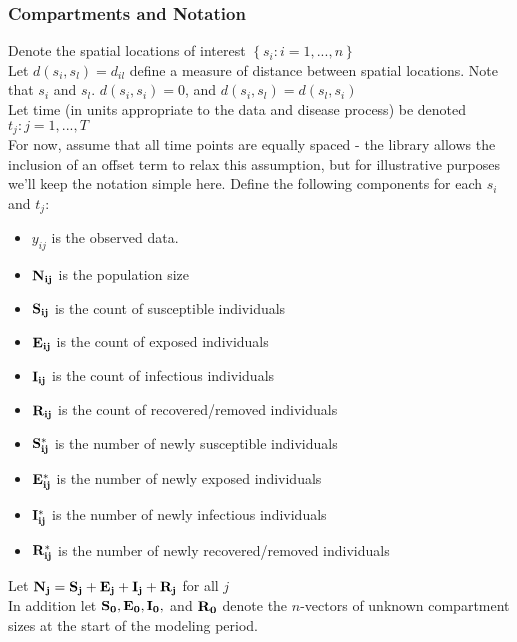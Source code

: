 \documentclass[12pt]{article}
\newcommand \itx {\indent \indent \indent}
\newcommand \mbreak {\\ \vspace{0.1in}}
\begin{document}
    \subsubsection{Compartments and Notation}
    {
        \itx
        Denote the spatial locations of interest $\left\{s_i : i = 1, ...,n \right\}$ \\
        Let $d(s_i, s_l) = d_{il}$ define a measure of distance between 
        spatial locations. Note that $s_i$ and $s_l$. $d(s_i, s_i) = 0$, and $d(s_i, s_l) = d(s_l, s_i)$ \\
        
        
        Let time (in units appropriate to the data and disease process) be denoted ${t_j : j = 1, ...,T}$ \\
        For now, assume that all time points are equally spaced - the library allows the inclusion of an offset term 
        to relax this assumption, but for illustrative purposes we'll keep the notation simple here. 
        Define the following components for each $s_i$ and $t_j$: \mbreak
    }
        \begin{itemize}
            \item {$y_{ij}$} is the observed data.
            \item {$\bf{N_{ij}}$} is the population size
            \item {$\bf{S_{ij}}$} is the count of susceptible individuals
            \item {$\bf{E_{ij}}$} is the count of exposed individuals
            \item {$\bf{I_{ij}}$} is the count of infectious individuals
            \item {$\bf{R_{ij}}$} is the count of recovered/removed individuals
            \item {$\bf{S^*_{ij}}$} is the number of newly susceptible individuals
            \item {$\bf{E^*_{ij}}$} is the number of newly exposed individuals
            \item {$\bf{I^*_{ij}}$} is the number of newly infectious individuals
            \item {$\bf{R^*_{ij}}$} is the number of newly recovered/removed individuals
        \end{itemize}
        Let {$\bf{N_j} = \bf{S_j + E_j + I_j + R_j}$} for all $j$\\
        In addition let ${\bf{S_0, E_0, I_0,}}$ and ${\bf{R_0}}$ denote the $n$-vectors of unknown compartment sizes at the 
        start of the modeling period. 
        
\end{document}

